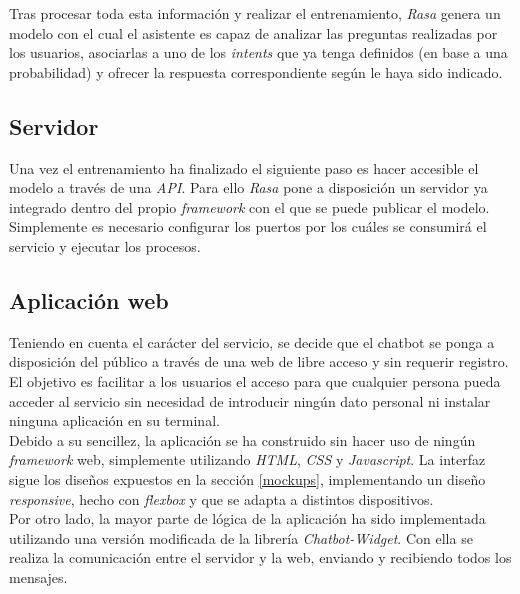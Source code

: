 Tras procesar toda esta información y realizar el entrenamiento, \textit{Rasa} genera un modelo con el cual el asistente es capaz de analizar las preguntas realizadas por los usuarios, asociarlas a uno de los \textit{intents} que ya tenga definidos (en base a una probabilidad) y ofrecer la respuesta correspondiente según le haya sido indicado.\\

\subsection{Servidor}
Una vez el entrenamiento ha finalizado el siguiente paso es hacer accesible el modelo a través de una \textit{API}. Para ello \textit{Rasa} pone a disposición un servidor ya integrado dentro del propio \textit{framework} con el que se puede publicar el modelo. Simplemente es necesario configurar los puertos por los cuáles se consumirá el servicio y ejecutar los procesos.

\subsection{Aplicación web}
Teniendo en cuenta el carácter del servicio, se decide que el chatbot se ponga a disposición del público a través de una web de libre acceso y sin requerir registro. El objetivo es facilitar a los usuarios el acceso para que cualquier persona pueda acceder al servicio sin necesidad de introducir ningún dato personal ni instalar ninguna aplicación en su terminal.\\

Debido a su sencillez, la aplicación se ha construido sin hacer uso de ningún \textit{framework} web, simplemente utilizando \textit{HTML}, \textit{CSS} y \textit{Javascript}. La interfaz sigue los diseños expuestos en la sección \ref{mockups}, implementando un diseño \textit{responsive}, hecho con \textit{flexbox} y que se adapta a distintos dispositivos.\\ 

Por otro lado, la mayor parte de lógica de la aplicación ha sido implementada utilizando una versión modificada de la librería \textit{Chatbot-Widget}. Con ella se realiza la comunicación entre el servidor y la web, enviando y recibiendo todos los mensajes.

